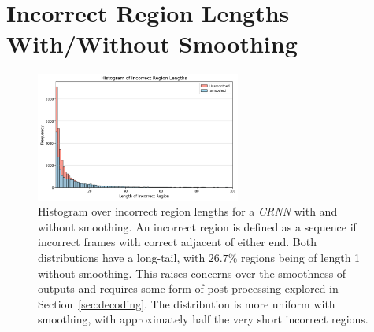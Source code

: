 \section{Incorrect Region Lengths With/Without Smoothing}\label{app:histogram_over_region_lengths}

\begin{figure}[H]
    \centering
    \includegraphics[width=0.6\textwidth]{figures/incorrect_region_smoothing_histogram.png}
    \caption{Histogram over incorrect region lengths for a \emph{CRNN} with and without smoothing. An incorrect region is defined as a sequence if incorrect frames with correct adjacent of either end. Both distributions have a long-tail, with $26.7\%$ regions being of length 1 without smoothing. This raises concerns over the smoothness of outputs and requires some form of post-processing explored in Section~\ref{sec:decoding}. The distribution is more uniform with smoothing, with approximately half the very short incorrect regions.}
    \label{fig:histogram_over_region_lengths}
\end{figure}